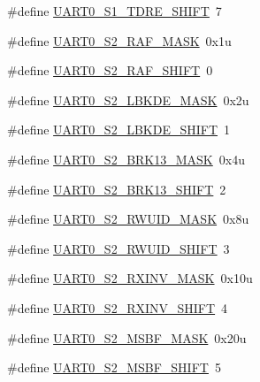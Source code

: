 \begin{DoxyCompactItemize}
\#define \hyperlink{group___u_a_r_t0___register___masks_gaf1ba1833eeb3d207610024627260a23a}{U\+A\+R\+T0\+\_\+\+S1\+\_\+\+T\+D\+R\+E\+\_\+\+S\+H\+I\+FT}~7
\item 
\#define \hyperlink{group___u_a_r_t0___register___masks_gad94f9eb4b442dddbafa335f05b46fb12}{U\+A\+R\+T0\+\_\+\+S2\+\_\+\+R\+A\+F\+\_\+\+M\+A\+SK}~0x1u
\item 
\#define \hyperlink{group___u_a_r_t0___register___masks_ga8e9f146d124df7852ee019088189a84a}{U\+A\+R\+T0\+\_\+\+S2\+\_\+\+R\+A\+F\+\_\+\+S\+H\+I\+FT}~0
\item 
\#define \hyperlink{group___u_a_r_t0___register___masks_ga3347bd085733dc5c1d7ed86259528d60}{U\+A\+R\+T0\+\_\+\+S2\+\_\+\+L\+B\+K\+D\+E\+\_\+\+M\+A\+SK}~0x2u
\item 
\#define \hyperlink{group___u_a_r_t0___register___masks_ga79be5f31bb69a54c78a60ae8859caa90}{U\+A\+R\+T0\+\_\+\+S2\+\_\+\+L\+B\+K\+D\+E\+\_\+\+S\+H\+I\+FT}~1
\item 
\#define \hyperlink{group___u_a_r_t0___register___masks_gaeda16004cc22274e11f447311ec15362}{U\+A\+R\+T0\+\_\+\+S2\+\_\+\+B\+R\+K13\+\_\+\+M\+A\+SK}~0x4u
\item 
\#define \hyperlink{group___u_a_r_t0___register___masks_ga655fdc462508918f7874cb9078e0336b}{U\+A\+R\+T0\+\_\+\+S2\+\_\+\+B\+R\+K13\+\_\+\+S\+H\+I\+FT}~2
\item 
\#define \hyperlink{group___u_a_r_t0___register___masks_ga56d14f088c8bf415092b13fc8a7ff8eb}{U\+A\+R\+T0\+\_\+\+S2\+\_\+\+R\+W\+U\+I\+D\+\_\+\+M\+A\+SK}~0x8u
\item 
\#define \hyperlink{group___u_a_r_t0___register___masks_ga087e7d36d10ab05400ef6a3acbe6f83a}{U\+A\+R\+T0\+\_\+\+S2\+\_\+\+R\+W\+U\+I\+D\+\_\+\+S\+H\+I\+FT}~3
\item 
\#define \hyperlink{group___u_a_r_t0___register___masks_ga81c81000cf5906711578a36178776ae9}{U\+A\+R\+T0\+\_\+\+S2\+\_\+\+R\+X\+I\+N\+V\+\_\+\+M\+A\+SK}~0x10u
\item 
\#define \hyperlink{group___u_a_r_t0___register___masks_ga7c2ed6447fb3c4daa5ed8fd4b29cffca}{U\+A\+R\+T0\+\_\+\+S2\+\_\+\+R\+X\+I\+N\+V\+\_\+\+S\+H\+I\+FT}~4
\item 
\#define \hyperlink{group___u_a_r_t0___register___masks_ga3d18e7a9445af9999a425598ae57dd1a}{U\+A\+R\+T0\+\_\+\+S2\+\_\+\+M\+S\+B\+F\+\_\+\+M\+A\+SK}~0x20u
\item 
\#define \hyperlink{group___u_a_r_t0___register___masks_gae193269e5cdcca203195efc7bd5a7e13}{U\+A\+R\+T0\+\_\+\+S2\+\_\+\+M\+S\+B\+F\+\_\+\+S\+H\+I\+FT}~5
\item 

\end{DoxyCompactItemize}

